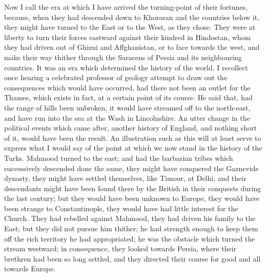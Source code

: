Now I call the era at which I
have arrived the turning-point of their fortunes, because, when
they had descended down to Khorasan and the countries below it, they
might have turned to the East or to the West, as they chose. They were
at liberty to turn their forces eastward against their kindred in
Hindostan, whom they had driven out of Ghizni and Affghanistan, or to
face towards the west, and make their way thither through the Saracens
of Persia and its neighbouring countries. It was an era which
determined the history of the world. I recollect once hearing a
celebrated professor of geology attempt to draw out the consequences
which would have occurred, had there not been an outlet for the
Thames, which exists in fact, at a certain point of its course. He
said that, had the range of hills been unbroken, it would have
streamed off to the north-east, and have run into the sea at the Wash
in Lincolnshire. An utter change in the political events which came
after, another history of England, and nothing short of it, would have
been the result. An illustration such as this will at least serve to
express what I would say of the point at which we now stand in the
history of the Turks. Mahmood turned to the east; and had the
barbarian tribes which successively descended done the same, they
might have conquered the Gaznevide dynasty, they might have settled
themselves, like Timour, at Delhi, and their descendants might have
been found there by the British in their conquests during the last
century; but they would have been unknown to Europe, they would have
been strange to Constantinople, they would have had little interest
for the Church. They had rebelled against Mahmood, they had driven his
family to the East; but they did not pursue him thither; he had
strength enough to keep them off the rich territory he had
appropriated; he was the obstacle which turned the stream
westward; in consequence, they looked towards Persia, where their
brethren had been so long settled, and they directed their course for
good and all towards Europe.

